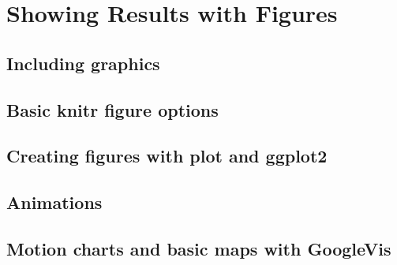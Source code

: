 



\chapter{Showing Results with Figures}\label{FiguresChapter}


\section{Including graphics}

\section{Basic knitr figure options}

\section{Creating figures with plot and ggplot2}

\section{Animations}

\section{Motion charts and basic maps with GoogleVis}
